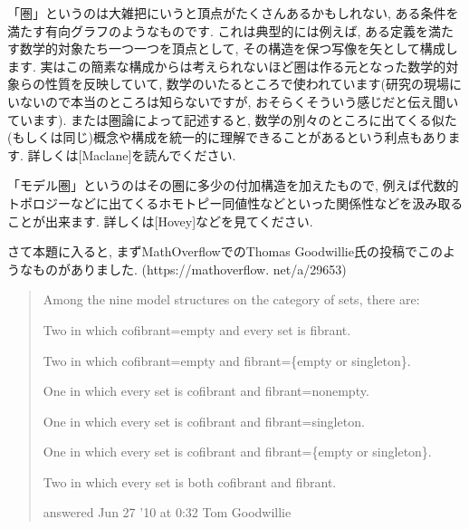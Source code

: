 \documentclass[. /main]{subfiles}
\theoremstyle{definition}
\begin{document}



「圏」というのは大雑把にいうと頂点がたくさんあるかもしれない, ある条件を満たす有向グラフのようなものです. これは典型的には例えば, ある定義を満たす数学的対象たち一つ一つを頂点として, その構造を保つ写像を矢として構成します. 実はこの簡素な構成からは考えられないほど圏は作る元となった数学的対象らの性質を反映していて, 数学のいたるところで使われています(研究の現場にいないので本当のところは知らないですが, おそらくそういう感じだと伝え聞いています). または圏論によって記述すると, 数学の別々のところに出てくる似た(もしくは同じ)概念や構成を統一的に理解できることがあるという利点もあります. 詳しくは[Maclane]を読んでください. 

「モデル圏」というのはその圏に多少の付加構造を加えたもので, 例えば代数的トポロジーなどに出てくるホモトピー同値性などといった関係性などを汲み取ることが出来ます. 詳しくは[Hovey]などを見てください. 

さて本題に入ると, まずMathOverflowでのThomas Goodwillie氏の投稿でこのようなものがありました. (https://mathoverflow. net/a/29653) \cite{Goodwillie}
\begin{quote}

Among the nine model structures on the category of sets,  there are:

Two in which cofibrant=empty and every set is fibrant. 

Two in which cofibrant=empty and fibrant=\{empty or singleton\}. 

One in which every set is cofibrant and fibrant=nonempty. 

One in which every set is cofibrant and fibrant=singleton. 

One in which every set is cofibrant and fibrant=\{empty or singleton\}. 

Two in which every set is both cofibrant and fibrant. 

\begin{flushright} answered Jun 27 '10 at 0:32
Tom Goodwillie \end{flushright}
\end{quote}
\end{document}
